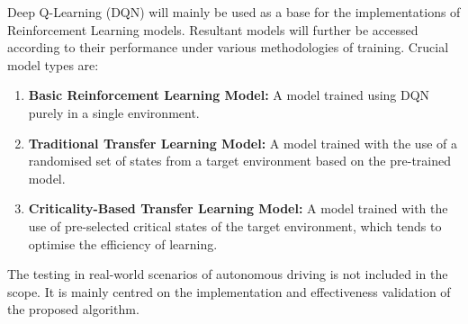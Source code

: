 Deep Q-Learning (DQN) will mainly be used as a base for the implementations of Reinforcement Learning models. Resultant models will further be accessed according to their performance under various methodologies of training. Crucial model types are: 

\begin{enumerate}
 \item \textbf{Basic Reinforcement Learning Model:} A model trained using DQN purely in a single environment.
 \item \textbf{Traditional Transfer Learning Model:} A model trained with the use of a randomised set of states from a target environment based on the pre-trained model.
 \item \textbf{Criticality-Based Transfer Learning Model:} A model trained with the use of pre-selected critical states of the target environment, which tends to optimise the efficiency of learning.
\end{enumerate}

The testing in real-world scenarios of autonomous driving is not included in the scope. It is mainly centred on the implementation and effectiveness validation of the proposed algorithm.